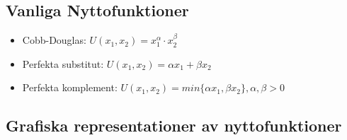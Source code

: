 \documentclass[12pt,a4paper]{article}
\begin{document}
{\subsection*{Vanliga Nyttofunktioner}
\begin{itemize}
    \item Cobb-Douglas: {\large $U(x_1, x_2) = x_1^{\alpha} \cdot x_2^{\beta}$}
    \item Perfekta substitut: {\large $U(x_1, x_2) = \alpha x_1 + \beta x_2$}
    \item Perfekta komplement: {\large $U(x_1, x_2) = min\{\alpha x_1, \beta x_2\}, \alpha, \beta > 0$}
\end{itemize}

\subsection*{Grafiska representationer av nyttofunktioner}

}
\end{document}
